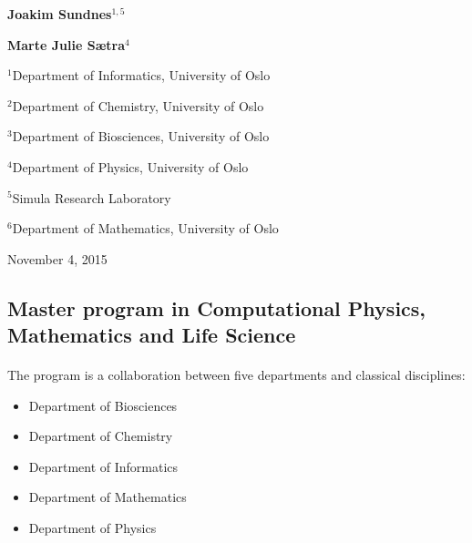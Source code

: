 \documentclass[%
oneside,                 %
final,                   %
10pt]{article}
\begin{document}
\begin{center}
{\bf Joakim Sundnes${}^{1, 5}$} \\ [0mm]
\end{center}


\begin{center}
{\bf Marte Julie Sætra${}^{4}$} \\ [0mm]
\end{center}

\begin{center}
\centerline{{\small ${}^1$Department of Informatics, University of Oslo}}
\centerline{{\small ${}^2$Department of Chemistry, University of Oslo}}
\centerline{{\small ${}^3$Department of Biosciences, University of Oslo}}
\centerline{{\small ${}^4$Department of Physics, University of Oslo}}
\centerline{{\small ${}^5$Simula Research Laboratory}}
\centerline{{\small ${}^6$Department of Mathematics, University of Oslo}}
\end{center}
    

\begin{center}
November 4, 2015
\end{center}

\vspace{1cm}


\subsection*{Master program in Computational Physics, Mathematics and Life Science}

\paragraph{}

The program is a collaboration between five departments and classical disciplines:

\begin{itemize}
 \item Department of Biosciences

 \item Department of Chemistry

 \item Department of Informatics

 \item Department of Mathematics

 \item Department of Physics
\end{itemize}
\end{document}
